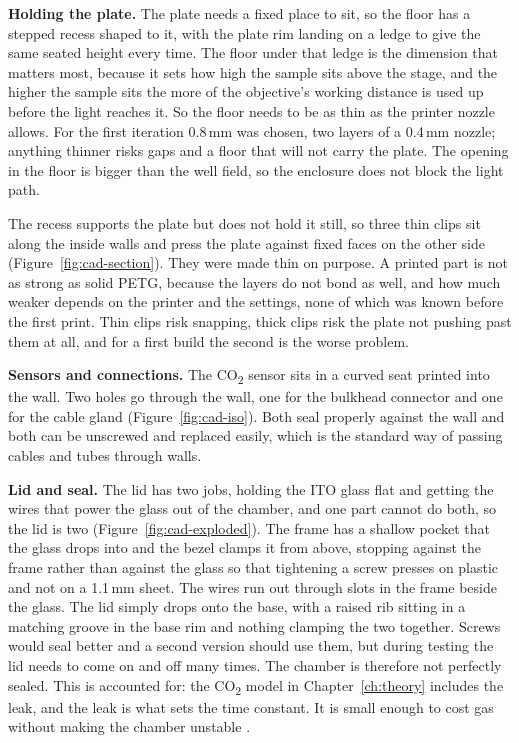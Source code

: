 \textbf{Holding the plate.} The plate needs a fixed place to sit, so the floor has a stepped recess shaped to it, with the plate rim landing on a ledge to give the same seated height every time. The floor under that ledge is the dimension that matters most, because it sets how high the sample sits above the stage, and the higher the sample sits the more of the objective's working distance is used up before the light reaches it. So the floor needs to be as thin as the printer nozzle allows. For the first iteration 0.8\,mm was chosen, two layers of a 0.4\,mm nozzle; anything thinner risks gaps and a floor that will not carry the plate. The opening in the floor is bigger than the well field, so the enclosure does not block the light path.

The recess supports the plate but does not hold it still, so three thin clips sit along the inside walls and press the plate against fixed faces on the other side (Figure~\ref{fig:cad-section}). They were made thin on purpose. A printed part is not as strong as solid PETG, because the layers do not bond as well, and how much weaker depends on the printer and the settings, none of which was known before the first print. Thin clips risk snapping, thick clips risk the plate not pushing past them at all, and for a first build the second is the worse problem.

\textbf{Sensors and connections.} The CO\textsubscript{2} sensor sits in a curved seat printed into the wall. Two holes go through the wall, one for the bulkhead connector and one for the cable gland (Figure~\ref{fig:cad-iso}). Both seal properly against the wall and both can be unscrewed and replaced easily, which is the standard way of passing cables and tubes through walls.

\textbf{Lid and seal.} The lid has two jobs, holding the ITO glass flat and getting the wires that power the glass out of the chamber, and one part cannot do both, so the lid is two (Figure~\ref{fig:cad-exploded}). The frame has a shallow pocket that the glass drops into and the bezel clamps it from above, stopping against the frame rather than against the glass so that tightening a screw presses on plastic and not on a 1.1\,mm sheet. The wires run out through slots in the frame beside the glass. The lid simply drops onto the base, with a raised rib sitting in a matching groove in the base rim and nothing clamping the two together. Screws would seal better and a second version should use them, but during testing the lid needs to come on and off many times. The chamber is therefore not perfectly sealed. This is accounted for: the CO\textsubscript{2} model in Chapter~\ref{ch:theory} includes the leak, and the leak is what sets the time constant. It is small enough to cost gas without making the chamber unstable \citep{talebipour_facilitating_2024}.

